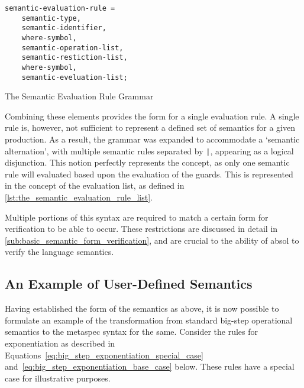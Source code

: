 \begin{listing}[!htb]
\begin{verbatim}
semantic-evaluation-rule = 
    semantic-type,
    semantic-identifier,
    where-symbol,
    semantic-operation-list,
    semantic-restiction-list,
    where-symbol, 
    semantic-eveluation-list;
\end{verbatim}
\caption{The Semantic Evaluation Rule Grammar}
\label{lst:the_semantic_evaluation_rule_grammar}
\end{listing}

Combining these elements provides the form for a single evaluation rule.
A single rule is, however, not sufficient to represent a defined set of semantics for a given production. 
As a result, the grammar was expanded to accommodate a `semantic alternation', with multiple semantic rules separated by \texttt{|}, appearing as a logical disjunction.
This notion perfectly represents the concept, as only one semantic rule will evaluated based upon the evaluation of the guards. 
This is represented in the concept of the evaluation list, as defined in \autoref{lst:the_semantic_evaluation_rule_list}.


Multiple portions of this syntax are required to match a certain form for verification to be able to occur. 
These restrictions are discussed in detail in \autoref{sub:basic_semantic_form_verification}, and are crucial to the ability of \gls{absol} to verify the language semantics.


\subsection{An Example of User-Defined Semantics} %
\label{sub:an_example_of_user_defined_semantics}
Having established the form of the semantics as above, it is now possible to formulate an example of the transformation from standard big-step operational semantics to the \gls{metaspec} syntax for the same.
Consider the rules for exponentiation as described in Equations~\ref{eq:big_step_exponentiation_special_case} and~\ref{eq:big_step_exponentiation_base_case} below.
These rules have a special case for illustrative purposes. 

